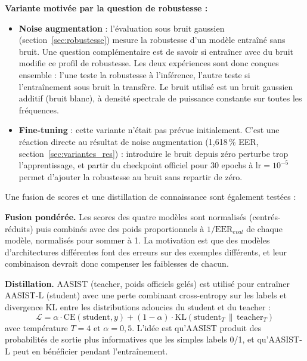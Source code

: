 \documentclass[10pt, a4paper]{article}
\begin{document}
\textbf{Variante motivée par la question de robustesse :}

\begin{itemize}
  \item \textbf{Noise augmentation} : l'évaluation sous bruit gaussien (section~\ref{sec:robustesse}) mesure la robustesse d'un modèle entraîné sans bruit. Une question complémentaire est de savoir si entraîner avec du bruit modifie ce profil de robustesse. Les deux expériences sont donc conçues ensemble : l'une teste la robustesse à l'inférence, l'autre teste si l'entraînement sous bruit la transfère. Le bruit utilisé est un bruit gaussien additif (bruit blanc), à densité spectrale de puissance constante sur toutes les fréquences.
\end{itemize}

\begin{itemize}
  \item \textbf{Fine-tuning} : cette variante n'était pas prévue initialement. C'est une réaction directe au résultat de noise augmentation (1,618\,\% EER, section~\ref{sec:variantes_res}) : introduire le bruit depuis zéro perturbe trop l'apprentissage, et partir du checkpoint officiel pour 30 epochs à $\text{lr}=10^{-5}$ permet d'ajouter la robustesse au bruit sans repartir de zéro.
\end{itemize}

Une fusion de scores et une distillation de connaissance sont également testées :

\textbf{Fusion pondérée.} Les scores des quatre modèles sont normalisés (centrés-réduits) puis combinés avec des poids proportionnels à $1/\text{EER}_{eval}$ de chaque modèle, normalisés pour sommer à 1. La motivation est que des modèles d'architectures différentes font des erreurs sur des exemples différents, et leur combinaison devrait donc compenser les faiblesses de chacun.

\textbf{Distillation.} AASIST (teacher, poids officiels gelés) est utilisé pour entraîner AASIST-L (student) avec une perte combinant cross-entropy sur les labels et divergence KL entre les distributions adoucies du student et du teacher :
\[
  \mathcal{L} = \alpha \cdot \text{CE}(\text{student}, y) + (1-\alpha)\cdot \text{KL}(\text{student}_T \,\|\, \text{teacher}_T)
\]
avec température $T=4$ et $\alpha = 0{,}5$. L'idée est qu'AASIST produit des probabilités de sortie plus informatives que les simples labels 0/1, et qu'AASIST-L peut en bénéficier pendant l'entraînement.

\end{document}

